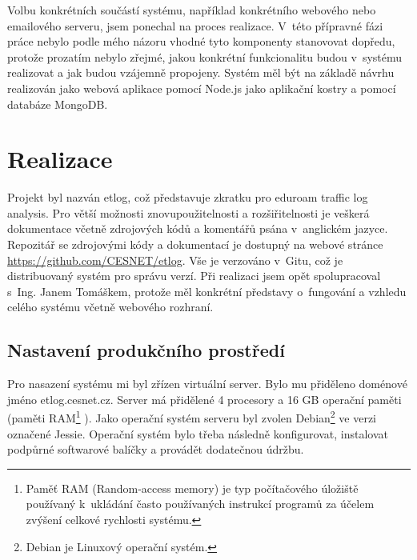 \documentclass[thesis=M,czech]{FITthesis}[2012/06/26]
\begin{document}
  Volbu konkrétních součástí systému,
  například konkrétního webového nebo emailového serveru, jsem ponechal na proces realizace.
  V~této přípravné fázi práce nebylo podle mého názoru vhodné tyto komponenty
  stanovovat dopředu, protože prozatím nebylo zřejmé, 
  jakou konkrétní funkcionalitu budou v~systému realizovat a jak budou vzájemně propojeny.
  Systém měl být na základě návrhu realizován 
  jako webová aplikace pomocí Node.js jako aplikační kostry a pomocí databáze MongoDB.




\chapter{Realizace}

  Projekt byl nazván etlog, což představuje zkratku pro eduroam traffic log analysis.
  Pro větší možnosti znovupoužitelnosti a rozšiřitelnosti je veškerá dokumentace 
  včetně zdrojových kódů a komentářů psána v~anglickém jazyce.
  Repozitář se zdrojovými kódy a dokumentací je dostupný na webové stránce \href{https://github.com/CESNET/etlog}{https://github.com/CESNET/etlog}.
  Vše je verzováno v~Gitu, což je distribuovaný systém pro správu verzí.
  Při realizaci jsem opět spolupracoval s~Ing. Janem Tomáškem, 
  protože měl konkrétní představy o~fungování a vzhledu celého systému včetně webového rozhraní.

  \section{Nastavení produkčního prostředí}

    Pro nasazení systému mi byl zřízen virtuální server.
    Bylo mu přiděleno doménové jméno
    etlog.cesnet.cz. Server má přidělené 4 procesory a 16 GB operační paměti (paměti RAM\footnote{
      Paměť RAM (Random-access memory) je typ počítačového úložiště používaný k~ukládání často používaných instrukcí programů
      za účelem zvýšení celkové rychlosti systému. 
    }
    ).
    Jako operační systém serveru byl zvolen Debian\footnote{
      Debian je Linuxový operační systém.
    }
    ve verzi označené Jessie.
    Operační systém bylo třeba následně konfigurovat, 
    instalovat podpůrné softwarové balíčky a provádět dodatečnou údržbu.
    
\end{document}
